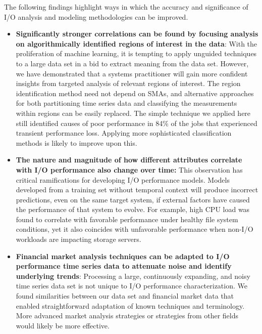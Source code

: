 The following findings highlight ways in which the accuracy and significance of I/O analysis and modeling methodologies can be improved.

\begin{itemize}[leftmargin=*]

\item \textbf{Significantly stronger correlations can be found by focusing analysis on algorithmically identified regions of interest in the data}:
With the proliferation of machine learning, it is tempting to apply unguided techniques to a large data set in a bid to extract meaning from the data set.
However, we have demonstrated that a systems practitioner will gain more confident insights from targeted analysis of relevant regions of interest.
The region identification method need not depend on SMAs, and alternative approaches for both partitioning time series data and classifying the measurements within regions can be easily replaced.
The simple technique we applied here still identified causes of poor performance in 84\% of the jobs that experienced transient performance loss.
Applying more sophisticated classification methods is likely to improve upon this.


\item \textbf{The nature and magnitude of how different attributes correlate with I/O performance also change over time:}
This observation has critical ramifications for developing I/O performance models.
Models developed from a training set without temporal context will produce incorrect predictions, even on the same target system, if
external factors have caused the performance of that system to evolve.
For example, high CPU load was found to correlate with favorable performance under healthy file system conditions, yet it also coincides with unfavorable performance when non-I/O workloads are impacting storage servers.

\item \textbf{Financial market analysis techniques can be adapted to I/O performance time series data to attenuate noise and identify underlying trends}:
Processing a large, continuously expanding, and noisy time series data set is not unique to I/O performance characterization.
We found similarities between our data set and financial market data that enabled straightforward adaptation of known techniques and terminology.
More advanced market analysis strategies or strategies from other fields would likely be more effective.

\end{itemize}
